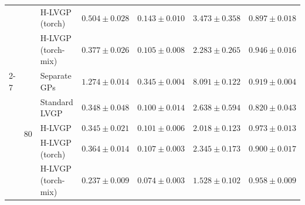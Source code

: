 \begin{table}[htbp]
\begin{tabular}{lllrrrr}
 &  & H-LVGP (torch) & $0.504 \pm 0.028$ & $0.143 \pm 0.010$ & $3.473 \pm 0.358$ & $0.897 \pm 0.018$ \\
 &  & H-LVGP (torch-mix) & \colorbox{green!20}{\boldmath$0.377 \pm 0.026$} & \colorbox{green!20}{\boldmath$0.105 \pm 0.008$} & \colorbox{green!20}{\boldmath$2.283 \pm 0.265$} & \colorbox{green!20}{\boldmath$0.946 \pm 0.016$} \\
\cmidrule(lr){2-7}
 & \multirow{5}{*}{80} & Separate GPs & $1.274 \pm 0.014$ & $0.345 \pm 0.004$ & $8.091 \pm 0.122$ & $0.919 \pm 0.004$ \\
 &  & Standard LVGP & $0.348 \pm 0.048$ & $0.100 \pm 0.014$ & $2.638 \pm 0.594$ & $0.820 \pm 0.043$ \\
 &  & H-LVGP & $0.345 \pm 0.021$ & $0.101 \pm 0.006$ & $2.018 \pm 0.123$ & $0.973 \pm 0.013$ \\
 &  & H-LVGP (torch) & $0.364 \pm 0.014$ & $0.107 \pm 0.003$ & $2.345 \pm 0.173$ & $0.900 \pm 0.017$ \\
 &  & H-LVGP (torch-mix) & \colorbox{green!20}{\boldmath$0.237 \pm 0.009$} & \colorbox{green!20}{\boldmath$0.074 \pm 0.003$} & \colorbox{green!20}{\boldmath$1.528 \pm 0.102$} & \colorbox{green!20}{\boldmath$0.958 \pm 0.009$} \\
\bottomrule
\end{tabular}
\end{table}

